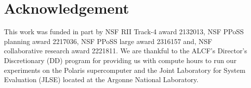 \documentclass[nonacm,sigplan]{acmart}
\newcommand{\tool}{\textsc{GPUlog}}
\begin{document}

\section{Acknowledgement}
This work was funded in part by NSF RII Track-4 award 2132013, NSF PPoSS planning award 2217036, NSF PPoSS large award 2316157 and, NSF collaborative research award 2221811. We are thankful to the ALCF’s Director’s Discretionary (DD) program for providing us with compute hours to run our experiments on the Polaris supercomputer and the Joint Laboratory for System Evaluation (JLSE) located at the Argonne National Laboratory. 



\end{document}
